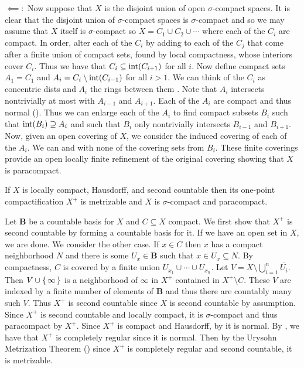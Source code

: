\documentclass[letterpaper, 11pt, oneside]{book}
\begin{document}
\begin{pf}
  $\impliedby\colon$ Now suppose that $X$ is the disjoint union of open $\sigma$-compact spaces.
  It is clear that the disjoint union of $\sigma$-compact spaces is $\sigma$-compact and so we may assume that $X$ itself is $\sigma$-compact so $X = C_{1} \cup C_{2} \cup \cdots$ where each of the $C_{i}$ are compact.
  In order, alter each of the $C_{i}$ by adding to each of the $C_{j}$ that come after a finite union of compact sets, found by local compactness, whose interiors cover $C_{i}$.
  Thus we have that $C_{i} \subseteq \operatorname{int}(C_{i + 1})$ for all $i$.
  Now define compact sets $A_{1} = C_{1}$ and $A_{i} = C_{i} \setminus \operatorname{int}(C_{i - 1})$ for all $i > 1$.
  We can think of the $C_{i}$ as concentric dists and $A_{i}$ the rings between them .
  Note that $A_{i}$ intersects nontrivially at most with $A_{i - 1}$ and $A_{i + 1}$.
  Each of the $A_{i}$ are compact and thus normal ().
  Thus we can enlarge each of the $A_{i}$ to find compact subsets $B_{i}$ such that $\operatorname{int}(B_{i}) \supseteq A_{i}$ and such that $B_{i}$ only nontrivially intersects $B_{i - 1}$ and $B_{i + 1}$.
  Now, given an open covering of $X$, we consider the induced covering of each of the $A_{i}$.
  We can  and with none of the covering sets  from $B_{i}$.
  These finite coverings provide an open locally finite refinement of the original covering showing that $X$ is paracompact.
\end{pf}

\begin{thrm}
  If $X$ is locally compact, Hausdorff, and second countable then its one-point compactification $X^{+}$ is metrizable and $X$ is $\sigma$-compact and paracompact.
\end{thrm}
\begin{pf}
  Let \textbf{B} be a countable basis for $X$ and $C \subseteq X$ compact.
  We first show that $X^{+}$ is second countable by forming a countable basis for it.
  If we have an open set in $X$, we are done.
  We consider the other case.
  If $x \in C$ then $x$ has a compact neighborhood $N$ and there is some $U_{x} \in \textbf{B}$ such that $x \in U_{x} \subseteq N$.
  By compactness, $C$ is covered by a finite union $U_{x_{1}} \cup \cdots \cup U_{x_{n}}$.
  Let $V = X \setminus \bigcup_{i = 1}^{n} \overline{U_{i}}$.
  Then $V \cup \set{\infty}$ is a neighborhood of $\infty$ in $X^{+}$ contained in $X^{+} \setminus C$.
  These $V$ are indexed by a finite number of elements of \textbf{B} and thus there are countably many such $V$.
  Thus $X^{+}$ is second countable since $X$ is second countable by assumption.
  Since $X^{+}$ is second countable and locally compact, it is $\sigma$-compact and thus paracompact by  $X^{+}$.
  Since $X^{+}$ is compact and Hausdorff, by  it is normal.
  By , we have that $X^{+}$ is completely regular since it is normal.
  Then by the Urysohn Metrization Theorem () since $X^{+}$ is completely regular and second countable, it is metrizable.
\end{pf}
\end{document}

